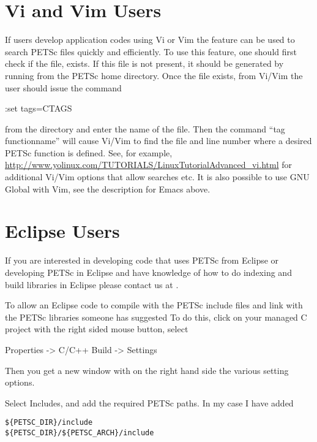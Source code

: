 {{\section{Vi and Vim Users}   

If users develop application codes  using Vi or Vim the  feature can be used to search PETSc
files quickly and efficiently.  To use this feature, one should
first check if the file,
 exists.  If this file is
not present, it should be generated by
running   from the PETSc home directory.
Once the file exists, from
Vi/Vim the user should issue
the command
\begin{tabbing}
:set tags=CTAGS
\end{tabbing}
from the  directory and enter the
name of the  file. Then the command ``tag functionname'' will cause Vi/Vim
to find the file and line number where a desired PETSc function
is defined.  See, for example, \href{http://www.yolinux.com/TUTORIALS/LinuxTutorialAdvanced_vi.html}{http://www.yolinux.com/TUTORIALS/LinuxTutorialAdvanced\_vi.html} for additional Vi/Vim options that allow searches etc.
It is also possible to use GNU Global with Vim, see the description for Emacs above.

\section{Eclipse Users} 

If you are interested in developing code that uses PETSc from Eclipse or developing PETSc in Eclipse and have knowledge of how to do indexing and build libraries in Eclipse please contact us at .

To allow an Eclipse code to compile with the PETSc include files and link with the PETSc libraries someone has suggested
To do this, click on your managed C project with the right sided mouse button, select

Properties -> C/C++ Build -> Settings

Then you get a new window with on the right hand side the various setting options.

Select Includes, and add the required PETSc paths. In my case I have added
\begin{verbatim}
${PETSC_DIR}/include
${PETSC_DIR}/${PETSC_ARCH}/include
\end{verbatim}

}}
